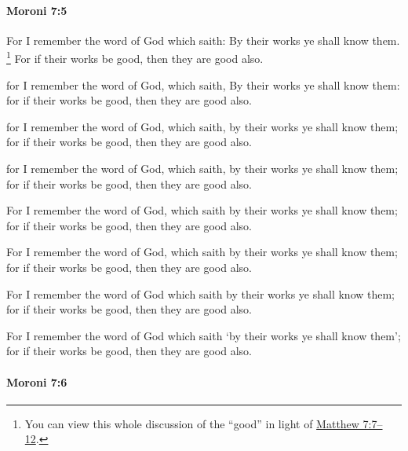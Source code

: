 		\paragraph{Moroni 7:5} %
			\label{MORONI-7-5}

			For I remember the word of God which saith:
			By their works ye shall know them.
				\footnote{%
					You can view this whole discussion of the ``good'' in light of \hyperref[MATTHEW-7-7]{Matthew 7:7--12}.
					}%
			For if their works be good, then they are good also.
			
			\begin{framed}
				\scriptsize
				\begin{compactdesc}
					\item[OM] [\textit{missing}]
					\item[PM] 
					\item[1830] for I remember the word of God, which saith, By their works ye shall know them: for if their works be good, then they are good also.
					\item[1837] for I remember the word of God, which saith, by their works ye shall know them; for if their works be good, then they are good also.
					\item[1840] for I remember the word of God, which saith, by their works ye shall know them; for if their works be good, then they are good also.
					\item[1879] For I remember the word of God, which saith by their works ye shall know them; for if their works be good, then they are good also.
					\item[1920] For I remember the word of God, which saith by their works ye shall know them; for if their works be good, then they are good also.
					\item[1981] For I remember the word of God which saith by their works ye shall know them; for if their works be good, then they are good also.
					\item[ABM] For I remember the word of God which saith `by their works ye shall know them'; for if their works be good, then they are good also.
				\end{compactdesc}
			\end{framed}

		\paragraph{Moroni 7:6}
			\label{MORONI-7-6}
			
